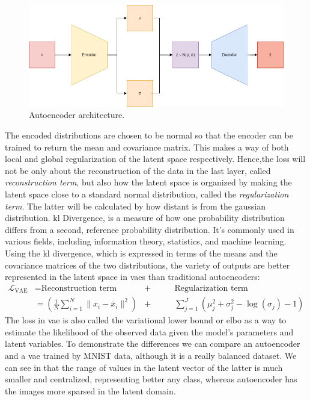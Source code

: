 \documentclass[../main.tex]{subfiles}
\begin{document}
\begin{figure}[H]
	\centering
	\includegraphics[width=15cm]{imgs/relatedwork/vae}
	\caption{Autoencoder architecture.}
	\label{fig:related-vae}
\end{figure}
The encoded distributions are chosen to be normal so that the encoder can be trained to return the mean and covariance matrix. This makes a way of both local and global regularization of the latent space respectively. Hence,the loss will not be only about the reconstruction of the data in the last layer, called \textit{reconstruction term}, but also how the latent space is organized by making the latent space close to a standard normal distribution, called the \textit{regularization term}. The latter will be calculated by how distant is from the gaussian distribution.
\gls{kl} Divergence, is a measure of how one probability distribution differs from a second, reference probability distribution. It's commonly used in various fields, including information theory, statistics, and machine learning.
Using the \gls{kl} divergence, which is expressed in terms of the means and the covariance matrices of the two distributions, the variety of outputs are better represented in the latent space in \gls{vae}s than traditional autoencoders:
\begin{equation}
	\label{eq:vae}
	\begin{aligned}
		\mathcal{L}_{\text{VAE}} &= \text{Reconstruction term} & + &\qquad \text{Regularization term}\\
		&= (\frac{1}{N} \sum_{i=1}^{N} \| x_i - \bar{x}_i \|^2) & + & \qquad \sum_{j=1}^{J} \left(\mu_j^2 + \sigma_j^2  - \log(\sigma_j)  - 1 \right)
	\end{aligned}
\end{equation}
The loss in \gls{vae} is also called the variational lower bound or \gls{elbo} as a way to estimate the likelihood of the observed data given the model's parameters and latent variables. To demonstrate the differences we can compare an autoencoder and a \gls{vae} trained by MNIST data, although it is a really balanced dataset. We can see in  that the range of values in the latent vector of the latter is much smaller and centralized, representing better any class, whereas autoencoder has the images more sparsed in the latent domain. %
\end{document}
